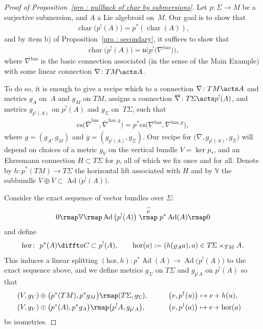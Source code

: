 \begin{proof}[Proof of Proposition~\ref{pro : pullback of char by submersions}] Let $p\colon \Sigma \to M$ be a surjective submersion, and $A$ a Lie algebroid on~$M$. Our goal is to show that\begin{gather*}\operatorname{char}\big(p^!(A)\big) = p^*(\operatorname{char}(A)),\end{gather*}and by item b) of Proposition~\ref{pro : secondary}, it suffices to show that\begin{gather*}\operatorname{char}\big(p^!(A)\big)=\mathfrak{u}\big(p^!\big(\nabla^{\mathrm{bas}}\big)\big),\end{gather*}where $\nabla^{\mathrm{bas}}$ is the basic connection associated (in the sense of the Main Example) with some linear connection $\nabla\colon TM \acts A$.

 To do so, it is enough to give a recipe which to a connection $\nabla\colon TM \acts A$ and metrics $g_A$ on~$A$ and $g_M$ on $TM$, assigns a connection $\overline{\nabla}\colon T\Sigma \acts p^!(A)$, and metrics $g_{p^!(A)}$ on $p^!(A)$ and $g_{\Sigma}$ on~$T\Sigma$, such that
\begin{gather}\label{ast-ast}
 \mathrm{cs}\big(\overline{\nabla}^{\mathrm{bas}},\overline{\nabla}^{\mathrm{bas},\overline{g}}\big) = p^*\mathrm{cs}\big(\nabla^{\mathrm{bas}},\nabla^{\mathrm{bas},g}\big),
\end{gather}where $g=(g_{A},g_{M})$ and $\overline{g}=(g_{p^!(A)},g_{\Sigma})$. Our recipe for $\big(\overline{\nabla},g_{p^!(A)},g_{\Sigma}\big)$ will depend on choices of a metric $g_V$ on the vertical bundle $V=\ker p_*$, and an Ehresmann connection $H \subset T\Sigma$ for $p$, all of which we fix once and for all. Denote by $h\colon p^*(TM) \to T\Sigma$ the horizontal lift associated with $H$ and by $\mathbb{V}$ the subbundle $V \oplus V \subset \operatorname{Ad}\big(p^!(A)\big)$.

Consider the exact sequence of vector bundles over $\Sigma$:
\begin{gather*}
0 \rmap \mathbb{V} \rmap \operatorname{Ad}\big(p^!(A)\big) \stackrel{\widetilde{p}}{\rmap} p^*\operatorname{Ad}(A) \rmap 0
\end{gather*}and define
\begin{gather*}
 \mathrm{hor}\colon \ p^*(A) \diffto C \subset p^!(A), \qquad \mathrm{hor}(a):=(h(\varrho_A a),a) \in T\Sigma \times_{TM}A.
\end{gather*}This induces a linear splitting $(\mathrm{hor},h)\colon p^*\operatorname{Ad}(A) \to \operatorname{Ad}\big(p^!(A)\big)$ to the exact sequence above, and we define metrics $g_{\Sigma}$ on $T\Sigma$ and $g_{p^!A}$ on $p^!(A)$ so that
 \begin{alignat*}{3}
 & (V,g_V) \oplus \big(p^*(TM),p^*g_M\big) \rmap (T\Sigma,g_{\Sigma}), \qquad && \big(v,p^{\dagger}(u)\big) \mapsto v+h(u), &\\
 & (V,g_V) \oplus \big(p^*(A),p^*g_A\big) \rmap \big(p^!A,g_{p^!A}\big),\qquad && \big(v,p^{\dagger}(a)\big) \mapsto v+\mathrm{hor}(a) &
 \end{alignat*}be isometries.


\end{proof}
